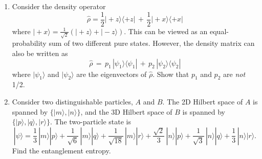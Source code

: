 \documentclass[pra,12pt]{revtex4-2}
\begin{document}
\begin{enumerate}
\begin{enumerate}[(a)]
\end{enumerate}


  
  \label{ex:singletproperties}

\item Consider the density operator
  \begin{equation}
    \hat{\rho} = \frac{1}{2} |\!+\!z\rangle \langle+z|
    \,+\, \frac{1}{2} |\!+\!x\rangle \langle+x|
  \end{equation}
  where $|\!+\!x\rangle = \frac{1}{\sqrt{2}} \left(|\!+\!z\rangle +
  |\!-\!z\rangle\right)$.  This can be viewed as an equal-probability
  sum of two different pure states.  However, the density matrix can
  also be written as
  \begin{equation}
    \hat{\rho} \,=\, p_1\, |\psi_1\rangle \langle \psi_1|
    \,+\, p_2\, |\psi_2\rangle \langle\psi_2|
  \end{equation}
  where $|\psi_{1}\rangle$ and $|\psi_{2}\rangle$ are the eigenvectors
  of $\hat{\rho}$.  Show that $p_1$ and $p_2$ are \textit{not} 1/2.
  \label{ex:rho_decomp}


\item 
  Consider two distinguishable particles, $A$ and $B$.  The 2D Hilbert
  space of $A$ is spanned by $\{|m\rangle, |n\rangle\}$, and the
  3D Hilbert space of $B$ is spanned by $\{|p\rangle, |q\rangle,
  |r\rangle\}$.  The two-particle state is
\begin{equation}
  |\psi\rangle = \frac{1}{3} \, |m\rangle|p\rangle
+ \frac{1}{\sqrt{6}} \, |m\rangle|q\rangle
+ \frac{1}{\sqrt{18}} \, |m\rangle|r\rangle
+ \frac{\sqrt{2}}{3} \, |n\rangle|p\rangle
+ \frac{1}{\sqrt{3}} \, |n\rangle|q\rangle
+ \frac{1}{3} \, |n\rangle|r\rangle.
\end{equation}
Find the entanglement entropy.

\end{enumerate}
\end{document}

